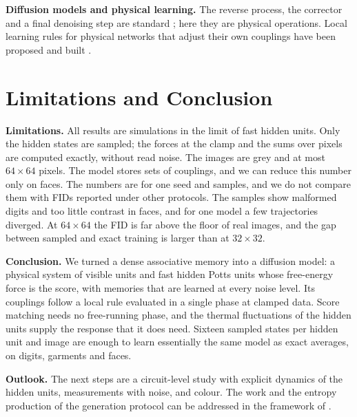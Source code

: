 \documentclass{article}
\newif\ifshownotes
\newcommand{\budget}[1]{\ifshownotes{\noindent\small\itshape\textcolor{notegray}{[Budget: #1]}\par}\fi}
\newcommand{\todo}[1]{\ifshownotes\textcolor{tbdcolor}{[TODO: #1]}\fi}
\begin{document}
\textbf{Diffusion models and physical learning.}
The reverse process, the corrector and a final denoising step are standard
\citep{song2019generative,ho2020denoising,song2021score}; here they are
physical operations. Local learning rules for physical networks that adjust
their own couplings have been proposed and built
\citep{stern2021supervised,dillavou2026imperfection}.
\todo{read De, Gower (both) and Wang \& Deng in full and correct the
sentences above; check for newer work.}

\section{Limitations and Conclusion}
\label{sec:conclusion}
\budget{0.5 page}

\textbf{Limitations.}
All results are simulations in the limit of fast hidden units. Only the
hidden states are sampled; the forces at the clamp and the sums over pixels
are computed exactly, without read noise. The images are grey and at most
$64\times64$ pixels. The model stores \nSlices{} sets of couplings, and we
can reduce this number only on faces. The numbers are for one seed and
\nSamples{} samples, and we do not compare them with FIDs reported under
other protocols. The samples show malformed digits and too little contrast
in faces, and for one model a few trajectories diverged. At $64\times64$ the
FID is far above the floor of real images, and the gap between sampled and
exact training is larger than at $32\times32$.

\textbf{Conclusion.}
We turned a dense associative memory into a diffusion model: a physical
system of visible units and fast hidden Potts units whose free-energy force
is the score, with memories that are learned at every noise level. Its
couplings follow a local rule evaluated in a single phase at clamped data.
Score matching needs no free-running phase, and the thermal fluctuations of the
hidden units supply the response that it does need. Sixteen sampled states
per hidden unit and image are enough to learn essentially the same model as
exact averages, on digits, garments and faces.

\textbf{Outlook.}
The next steps are a circuit-level study with explicit dynamics of the hidden
units, measurements with noise, and colour. The work and the entropy
production of the generation protocol can be addressed in the framework of
\citet{rooke2026stochastic}.
\end{document}

